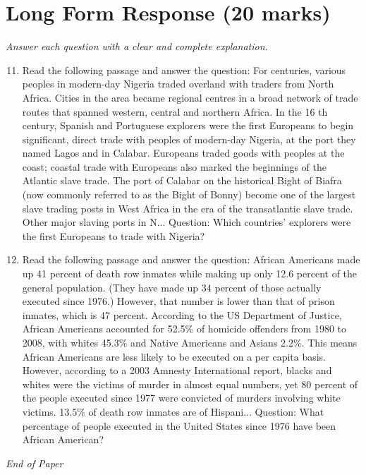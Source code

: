\documentclass[12pt]{article}
\begin{document}
\section*{Long Form Response (20 marks)}
\textit{Answer each question with a clear and complete explanation.}
\begin{enumerate}[label=\arabic*.]
\setcounter{enumi}{10}
\item Read the following passage and answer the question: For centuries, various peoples in modern-day Nigeria traded overland with traders from North Africa. Cities in the area became regional centres in a broad network of trade routes that spanned western, central and northern Africa. In the 16 th century, Spanish and Portuguese explorers were the first Europeans to begin significant, direct trade with peoples of modern-day Nigeria, at the port they named Lagos and in Calabar. Europeans traded goods with peoples at the coast; coastal trade with Europeans also marked the beginnings of the Atlantic slave trade. The port of Calabar on the historical Bight of Biafra (now commonly referred to as the Bight of Bonny) become one of the largest slave trading posts in West Africa in the era of the transatlantic slave trade. Other major slaving ports in N... Question: Which countries' explorers were the first Europeans to trade with Nigeria?
\item Read the following passage and answer the question: African Americans made up 41 percent of death row inmates while making up only 12.6 percent of the general population. (They have made up 34 percent of those actually executed since 1976.) However, that number is lower than that of prison inmates, which is 47 percent. According to the US Department of Justice, African Americans accounted for 52.5\% of homicide offenders from 1980 to 2008, with whites 45.3\% and Native Americans and Asians 2.2\%. This means African Americans are less likely to be executed on a per capita basis. However, according to a 2003 Amnesty International report, blacks and whites were the victims of murder in almost equal numbers, yet 80 percent of the people executed since 1977 were convicted of murders involving white victims. 13.5\% of death row inmates are of Hispani... Question: What percentage of people executed in the United States since 1976 have been African American?
\end{enumerate}

\vfill
\noindent\textit{End of Paper}
\end{document}

